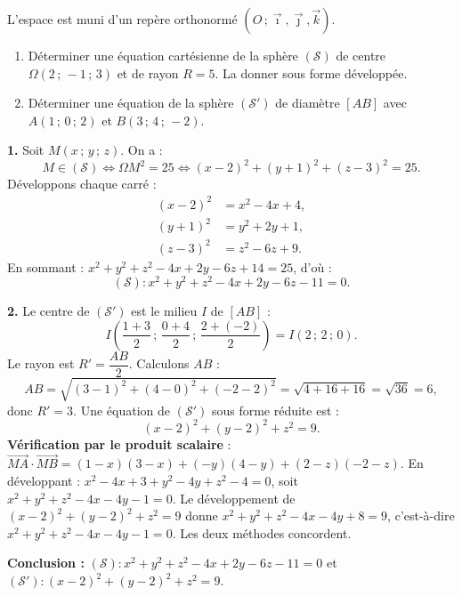 \documentclass[11pt]{article}
\begin{document}
\begin{exoresolu}
L'espace est muni d'un repère orthonormé $(O\,;\vec{\imath},\vec{\jmath},\vec{k})$.
\begin{enumerate}
\item Déterminer une équation cartésienne de la sphère $(\mathcal{S})$ de centre $\Omega(2\,;\,-1\,;\,3)$ et de rayon $R=5$. La donner sous forme développée.
\item Déterminer une équation de la sphère $(\mathcal{S}')$ de diamètre $[AB]$ avec $A(1\,;\,0\,;\,2)$ et $B(3\,;\,4\,;\,-2)$.
\end{enumerate}
\tcblower
\textbf{1.} Soit $M(x\,;\,y\,;\,z)$. On a :
\[ M \in (\mathcal{S}) \iff \Omega M^2 = 25 \iff (x-2)^2+(y+1)^2+(z-3)^2=25. \]
Développons chaque carré :
\begin{align*}
(x-2)^2 &= x^2-4x+4,\\
(y+1)^2 &= y^2+2y+1,\\
(z-3)^2 &= z^2-6z+9.
\end{align*}
En sommant : $x^2+y^2+z^2-4x+2y-6z+14 = 25$, d'où :
\[ \boxed{(\mathcal{S}) : x^2+y^2+z^2-4x+2y-6z-11=0.} \]

\textbf{2.} Le centre de $(\mathcal{S}')$ est le milieu $I$ de $[AB]$ :
\[ I\left(\frac{1+3}{2}\,;\,\frac{0+4}{2}\,;\,\frac{2+(-2)}{2}\right) = I(2\,;\,2\,;\,0). \]
Le rayon est $R'=\dfrac{AB}{2}$. Calculons $AB$ :
\[ AB = \sqrt{(3-1)^2+(4-0)^2+(-2-2)^2}=\sqrt{4+16+16}=\sqrt{36}=6, \]
donc $R'=3$. Une équation de $(\mathcal{S}')$ sous forme réduite est :
\[ (x-2)^2+(y-2)^2+z^2=9. \]
\textbf{Vérification par le produit scalaire} : $\overrightarrow{MA}\cdot\overrightarrow{MB}=(1-x)(3-x)+(-y)(4-y)+(2-z)(-2-z)$.
En développant : $x^2-4x+3+y^2-4y+z^2-4=0$, soit $x^2+y^2+z^2-4x-4y-1=0$.
Le développement de $(x-2)^2+(y-2)^2+z^2=9$ donne $x^2+y^2+z^2-4x-4y+8=9$, c'est-à-dire $x^2+y^2+z^2-4x-4y-1=0$. Les deux méthodes concordent.

\textbf{Conclusion :} $(\mathcal{S}) : x^2+y^2+z^2-4x+2y-6z-11=0$ et $(\mathcal{S}') : (x-2)^2+(y-2)^2+z^2=9$.
\end{exoresolu}
\end{document}
